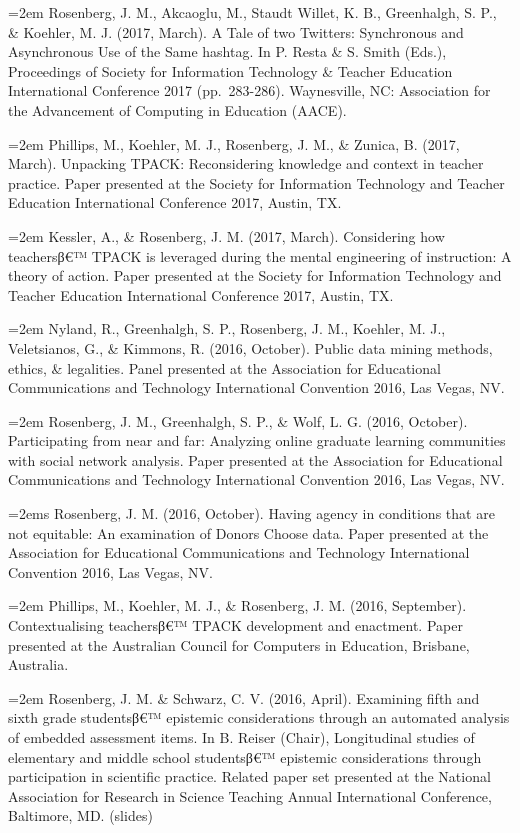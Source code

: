 \documentclass[]{article}
\newcommand{\euro}{€}
\begin{document}
\hangindent=2em Rosenberg, J. M., Akcaoglu, M., Staudt Willet, K. B.,
Greenhalgh, S. P., \& Koehler, M. J. (2017, March). A Tale of two
Twitters: Synchronous and Asynchronous Use of the Same hashtag. In P.
Resta \& S. Smith (Eds.), Proceedings of Society for Information
Technology \& Teacher Education International Conference 2017
(pp.~283-286). Waynesville, NC: Association for the Advancement of
Computing in Education (AACE).

\hangindent=2em Phillips, M., Koehler, M. J., Rosenberg, J. M., \&
Zunica, B. (2017, March). Unpacking TPACK: Reconsidering knowledge and
context in teacher practice. Paper presented at the Society for
Information Technology and Teacher Education International Conference
2017, Austin, TX.

\hangindent=2em Kessler, A., \& Rosenberg, J. M. (2017, March).
Considering how teachersβ\euro{}™ TPACK is leveraged during the mental
engineering of instruction: A theory of action. Paper presented at the
Society for Information Technology and Teacher Education International
Conference 2017, Austin, TX.

\hangindent=2em Nyland, R., Greenhalgh, S. P., Rosenberg, J. M.,
Koehler, M. J., Veletsianos, G., \& Kimmons, R. (2016, October). Public
data mining methods, ethics, \& legalities. Panel presented at the
Association for Educational Communications and Technology International
Convention 2016, Las Vegas, NV.

\hangindent=2em Rosenberg, J. M., Greenhalgh, S. P., \& Wolf, L. G.
(2016, October). Participating from near and far: Analyzing online
graduate learning communities with social network analysis. Paper
presented at the Association for Educational Communications and
Technology International Convention 2016, Las Vegas, NV.

\hangindent=2ems Rosenberg, J. M. (2016, October). Having agency in
conditions that are not equitable: An examination of Donors Choose data.
Paper presented at the Association for Educational Communications and
Technology International Convention 2016, Las Vegas, NV.

\hangindent=2em Phillips, M., Koehler, M. J., \& Rosenberg, J. M. (2016,
September). Contextualising teachersβ\euro{}™ TPACK development and
enactment. Paper presented at the Australian Council for Computers in
Education, Brisbane, Australia.

\hangindent=2em Rosenberg, J. M. \& Schwarz, C. V. (2016, April).
Examining fifth and sixth grade studentsβ\euro{}™ epistemic
considerations through an automated analysis of embedded assessment
items. In B. Reiser (Chair), Longitudinal studies of elementary and
middle school studentsβ\euro{}™ epistemic considerations through
participation in scientific practice. Related paper set presented at the
National Association for Research in Science Teaching Annual
International Conference, Baltimore, MD. (slides)
\end{document}
